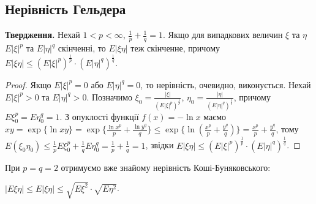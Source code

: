\subsection{Нерівність Гельдера}
\noindent\textbf{Твердження.} Нехай $1 < p < \infty$, $\frac{1}{p} + \frac{1}{q} = 1$. Якщо для випадкових величин $\xi$ та $\eta$ 
$E\left| \xi\right|^p$ та $E\left| \eta\right|^q$ скінченні, то $E\left| \xi \eta\right|$ теж скінченне, причому
$E\left| \xi \eta\right| \leq \left( E\left| \xi\right|^p\right)^{\frac{1}{p}} \cdot \left( E\left| \eta\right|^q\right)^{\frac{1}{q}}$.
\begin{proof}
    Якщо $E\left| \xi\right|^p = 0$ або $E\left| \eta\right|^q = 0$, то нерівність, очевидно, виконується.
    Нехай $E\left| \xi\right|^p >0$ та $E\left| \eta\right|^q > 0$. Позначимо $\xi_0 = \frac{\left| \xi \right|}{\left( E\left| \xi\right|^p\right)^{\frac{1}{p}}}$,
    $\eta_0 = \frac{\left| \eta \right|}{\left( E\left| \eta\right|^q\right)^{\frac{1}{q}}}$, причому $E\xi_0^p = E\eta_0^q = 1$.
    З опуклості функції $f(x) = -\ln x$ маємо $xy = \exp\{\ln xy\}= \exp\{\frac{\ln x^p}{p} + \frac{\ln y^q}{q}\} \leq
    \exp\{ \ln \left( \frac{x^p}{p} + \frac{y^q}{q}\right)\} = \frac{x^p}{p} + \frac{y^q}{q}$, тому
    $E\left( \xi_0 \eta_0 \right) \leq \frac{1}{p}E\xi_0^p + \frac{1}{q}E\eta_0^q = \frac{1}{p} + \frac{1}{q} = 1$,
    звідки $E\left| \xi \eta\right| \leq \left( E\left| \xi\right|^p\right)^{\frac{1}{p}} \cdot \left( E\left| \eta\right|^q\right)^{\frac{1}{q}}$.
\end{proof}
\begin{remark}
    При $p = q = 2$ отримуємо вже знайому нерівність Коші-Буняковського:
    
    \noindent$\left| E \xi \eta \right| \leq E\left| \xi \eta \right| \leq \sqrt{E\xi^2}\cdot\sqrt{E\eta^2}$.
\end{remark}

